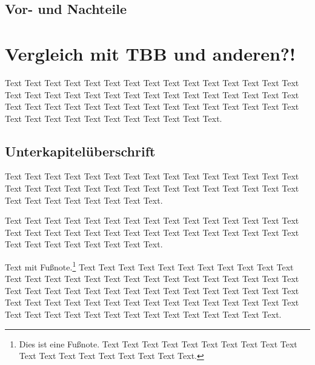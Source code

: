 \documentclass{lni}
\begin{document}
\subsection{Vor- und Nachteile}

\pagebreak

\section{Vergleich mit TBB und anderen?!}

Text Text Text Text Text Text Text Text Text Text Text Text Text Text Text Text Text Text Text Text Text Text Text Text Text Text Text Text Text Text Text Text Text Text Text Text Text Text Text Text Text Text Text Text Text Text Text Text Text Text Text Text Text Text Text Text.

\subsection{Unterkapitelüberschrift}

Text Text Text Text Text Text Text Text Text Text Text Text Text Text Text Text Text Text Text Text Text Text Text Text Text Text Text Text Text Text Text Text Text Text Text Text Text Text.


Text Text Text Text Text Text Text Text Text Text Text Text Text Text Text Text Text Text Text Text Text Text Text Text Text Text Text Text Text Text Text Text Text Text Text Text Text Text.

Text mit Fußnote.\footnote{Dies ist eine Fußnote. Text Text Text Text Text Text Text Text Text Text Text Text Text Text Text Text Text Text Text.} Text \cite{Ez99,ABC01} Text Text Text Text Text Text Text Text Text Text Text Text Text Text Text Text Text Text Text Text Text Text Text Text Text Text Text Text  Text Text Text Text Text Text Text Text Text Text Text Text Text Text Text Text Text Text Text Text Text Text Text Text Text Text Text Text Text Text Text Text Text Text Text Text Text Text Text Text Text.

\pagebreak



\newpage
\end{document}
